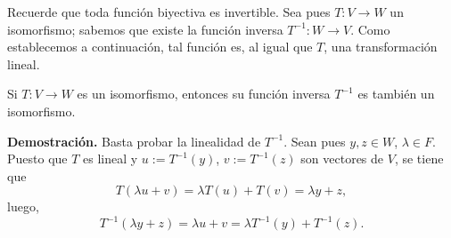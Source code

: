 Recuerde que toda función biyectiva es invertible. 
Sea pues $T: V \longrightarrow W$ un isomorfismo; sabemos que existe
la función inversa $T^{-1}: W \longrightarrow V$. Como establecemos
a continuación, tal función es, al igual que $T$, una transformación lineal.
\begin{prop}
Si $T: V \longrightarrow W$ es un isomorfismo, entonces
su función inversa $T^{-1}$ es también un isomorfismo.
\end{prop}
\noindent
\textbf{Demostración.}
Basta probar la linealidad de $T^{-1}$. Sean pues
$y, z \in W$, $\lambda \in F$. Puesto que $T$ es lineal
y $u := T^{-1}(y)$, $v := T^{-1}(z)$ son vectores de $V$,
se tiene que 
\[
T( \lambda u + v) = \lambda T(u) + T(v) = \lambda y +z,
\]
luego,
\[
T^{-1}(\lambda y + z) = \lambda u + v = \lambda T^{-1}(y) + T^{-1}(z).
\]

\QEDB
\vspace{0.2cm}

